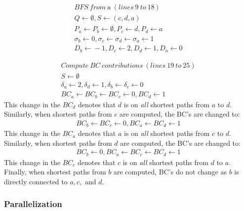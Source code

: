 \begin{align*}
BFS\ from\ a\ (lines\ 9\ to\ 18)\\
Q \leftarrow{} \emptyset{}, S \leftarrow{} (c,d,a) \\
P_a\leftarrow{}P_b\leftarrow{}\emptyset{}, P_c\leftarrow{}d,P_d\leftarrow{}a\\
\sigma{}_b\leftarrow{}0,\sigma{}_c\leftarrow{}\sigma{}_d\leftarrow{}\sigma{}_a\leftarrow{}1\\
D_b\leftarrow{}-1,D_c\leftarrow{}2,D_d\leftarrow{}1,D_a\leftarrow{}0
\end{align*}

\begin{align*}
Compute\ BC\ contributions\ (lines\ 19\ to\ 25)\\
S\leftarrow{}\emptyset{}\\
\delta{}_a\leftarrow{}2,\delta{}_d\leftarrow{}1,\delta{}_b\leftarrow{}\delta{}_c\leftarrow{}0\\
BC_a\leftarrow{}BC_b\leftarrow{}BC_c\leftarrow{}0,BC_d\leftarrow{}1
\end{align*}
%
This change in the $BC_d$ denotes that $d$ is on \textit{all} shortest paths
from $a$ to $d$.
%
Similarly, when shortest paths from $c$ are computed, the BC's are changed 
to:
%
\begin{align*}
BC_b\leftarrow{}BC_c\leftarrow{}0,BC_a\leftarrow{}BC_d\leftarrow{}1
\end{align*}
%
This change in the $BC_a$ denotes that $a$ is on \textit{all} shortest paths
from $c$ to $d$.
%
Similarly, when shortest paths from $d$ are computed, the BC's are changed 
to:
%
\begin{align*}
BC_b\leftarrow{}0,BC_a\leftarrow{}BC_c\leftarrow{}BC_d\leftarrow{}1
\end{align*}
%
This change in the $BC_c$ denotes that $c$ is on \textit{all} shortest paths
from $d$ to $a$.
%
Finally, when shortest paths from $b$ are computed, BC's do not change as 
$b$ is directly connected to $a,c,$ and $d$.

%
%
\subsubsection{Parallelization}
%

%
%
